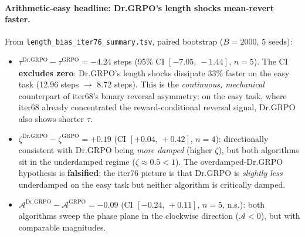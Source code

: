 \documentclass{article}
\begin{document}
\paragraph{Arithmetic-easy headline: Dr.GRPO's length shocks mean-revert
faster.}
From \texttt{length\_bias\_iter76\_summary.tsv}, paired bootstrap
($B = 2000$, $5$ seeds):
\begin{itemize}
\item $\tau^{\mathrm{Dr.GRPO}} - \tau^{\mathrm{GRPO}} = -4.24$ steps
      (95\% CI $[-7.05,\,-1.44]$, $n = 5$). The CI \textbf{excludes
      zero}: Dr.GRPO's length shocks dissipate $33\%$ faster on the
      easy task (12.96 steps $\to$ 8.72 steps). This is the
      \emph{continuous, mechanical} counterpart of iter68's binary
      reversal asymmetry: on the easy task, where iter68 already
      concentrated the reward-conditional reversal signal, Dr.GRPO
      also shows shorter $\tau$.
\item $\zeta^{\mathrm{Dr.GRPO}} - \zeta^{\mathrm{GRPO}} = +0.19$
      (CI $[+0.04,\,+0.42]$, $n = 4$): directionally consistent with
      Dr.GRPO being \emph{more damped} (higher $\zeta$),
      but both algorithms sit in the underdamped regime
      ($\zeta \approx 0.5 < 1$). The overdamped-Dr.GRPO hypothesis is
      \textbf{falsified}; the iter76 picture is that Dr.GRPO is
      \emph{slightly less} underdamped on the easy task but neither
      algorithm is critically damped.
\item $\mathcal{A}^{\mathrm{Dr.GRPO}} - \mathcal{A}^{\mathrm{GRPO}} = -0.09$
      (CI $[-0.24,\,+0.11]$, $n = 5$, n.s.): both algorithms sweep the
      phase plane in the clockwise direction ($\mathcal{A} < 0$), but
      with comparable magnitudes.
\end{itemize}
\end{document}
